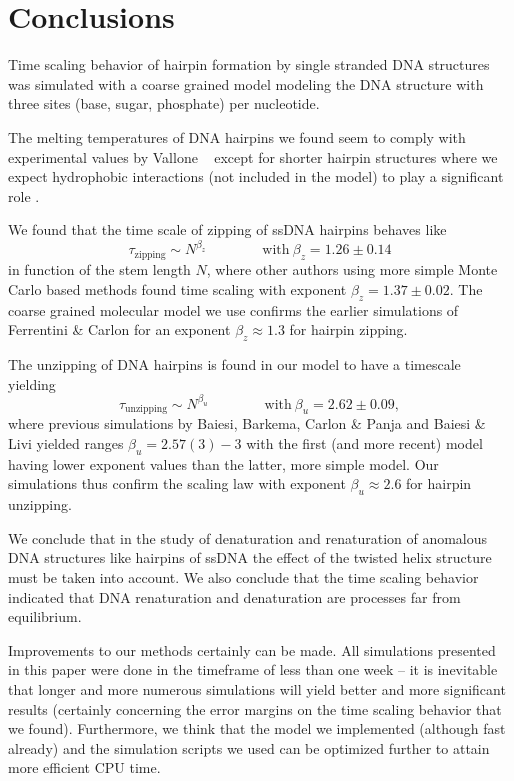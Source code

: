 \section{Conclusions}

Time scaling behavior of hairpin formation by single stranded DNA structures was simulated with a coarse grained model modeling the DNA structure with three sites (base, sugar, phosphate) per nucleotide.

The melting temperatures of DNA hairpins we found seem to comply with experimental values by Vallone \etal\ \cite{vallone1999melting} except for shorter hairpin structures where we expect hydrophobic interactions (not included in the model) to play a significant role \cite{kuznetsov2001semiflexible}.

We found that the time scale of zipping of ssDNA hairpins behaves like
\begin{equation}
\tau_\text{zipping} \sim N^{\beta_z} \qquad \qquad \text{with}\ \beta_z = 1.26\pm0.14
\end{equation}
in function of the stem length $N$, where other authors using more simple Monte Carlo based methods found time scaling with exponent $\beta_z = 1.37 \pm 0.02$. The coarse grained molecular model we use confirms the earlier simulations of Ferrentini \& Carlon \cite{carlon2011anomalous} for an exponent $\beta_z \approx 1.3$ for hairpin zipping.

The unzipping of DNA hairpins is found in our model to have a timescale yielding
\begin{equation}
\tau_\text{unzipping} \sim N^{\beta_u} \qquad \qquad \text{with}\ \beta_u = 2.62\pm0.09,
\end{equation}
where previous simulations by Baiesi, Barkema, Carlon \& Panja \cite{carlon2010unwinding} and Baiesi \& Livi \cite{baiesi2009multiple} yielded ranges $\beta_u = 2.57(3) - 3$ with the first (and more recent) model having lower exponent values than the latter, more simple model. Our simulations thus confirm the scaling law with exponent $\beta_u \approx 2.6$ for hairpin unzipping.

We conclude that in the study of denaturation and renaturation of anomalous DNA structures like hairpins of ssDNA the effect of the twisted helix structure must be taken into account. We also conclude that the time scaling behavior indicated that DNA renaturation and denaturation are processes far from equilibrium.

Improvements to our methods certainly can be made. All simulations presented in this paper were done in the timeframe of less than one week -- it is inevitable that longer and more numerous simulations will yield better and more significant results (certainly concerning the error margins on the time scaling behavior that we found). Furthermore, we think that the model we implemented (although fast already) and the simulation scripts we used can be optimized further to attain more efficient CPU time.